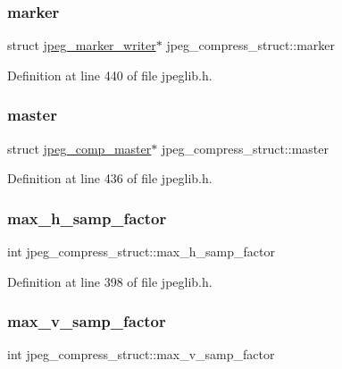 \subsubsection{\texorpdfstring{marker}{marker}}
{\footnotesize\ttfamily struct \mbox{\hyperlink{structjpeg__marker__writer}{jpeg\+\_\+marker\+\_\+writer}}$\ast$ jpeg\+\_\+compress\+\_\+struct\+::marker}



Definition at line 440 of file jpeglib.\+h.

\mbox{\label{structjpeg__compress__struct_a50b9c60f47c9fff393d7d5b3a7b3618e}} 
\subsubsection{\texorpdfstring{master}{master}}
{\footnotesize\ttfamily struct \mbox{\hyperlink{structjpeg__comp__master}{jpeg\+\_\+comp\+\_\+master}}$\ast$ jpeg\+\_\+compress\+\_\+struct\+::master}



Definition at line 436 of file jpeglib.\+h.

\mbox{\label{structjpeg__compress__struct_ae8de4e6079b80e3a81135d07934c640d}} 
\subsubsection{\texorpdfstring{max\_h\_samp\_factor}{max\_h\_samp\_factor}}
{\footnotesize\ttfamily int jpeg\+\_\+compress\+\_\+struct\+::max\+\_\+h\+\_\+samp\+\_\+factor}



Definition at line 398 of file jpeglib.\+h.

\mbox{\label{structjpeg__compress__struct_a9e03a4eb7af87c682937caed3d341d4a}} 
\subsubsection{\texorpdfstring{max\_v\_samp\_factor}{max\_v\_samp\_factor}}
{\footnotesize\ttfamily int jpeg\+\_\+compress\+\_\+struct\+::max\+\_\+v\+\_\+samp\+\_\+factor}



